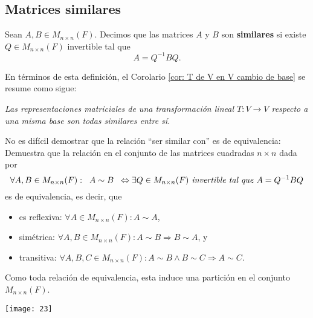 \subsection{Matrices similares}

\begin{defi}
Sean $A, B \in M_{n \times n}(F)$. Decimos que las matrices $A$ y $B$
son \textbf{similares} si existe $Q \in M_{n \times n}(F)$ invertible tal que
\[
A = Q^{-1}B Q.
\]
\end{defi}
En términos de esta definición, el Corolario 
\ref{cor: T de V en V cambio de base} se resume como sigue:
\begin{center}
\textit{Las representaciones matriciales de una transformación lineal
$T: V \longrightarrow V$ respecto a una misma base son todas similares entre
sí.}
\end{center}
No es difícil demostrar que la relación ``ser similar con''
es de equivalencia:
\noindent
{} Demuestra que la relación en el conjunto
de las matrices cuadradas $n \times n$ dada por
\begin{equation}
	\label{eq: relacion equiv ser similar a}
\forall A, B \in M_{n \times n}(F): \hspace{0.2cm}
A \sim B \hspace{0.2cm} \Leftrightarrow
\exists Q \in M_{n \times n}(F) \textit{ invertible tal que }
A = Q^{-1}B Q
\end{equation}
es de equivalencia, es decir, que 
\begin{itemize}
	\item es reflexiva: $\forall A \in M_{n \times n}(F): A \sim A$,
	\item simétrica: $\forall A, B \in M_{n \times n}(F): A \sim B
	\Rightarrow B \sim A$, y
	\item transitiva: $\forall A, B, C \in M_{n \times n}(F):
	A \sim B \wedge B \sim C \Rightarrow A \sim C$.
\end{itemize}

Como toda relación de equivalencia, esta induce una partición
en el conjunto $M_{n \times n}(F)$. 


\begin{marginfigure}
\texttt{[image: 23]} 
		\caption{ }
\end{marginfigure}


